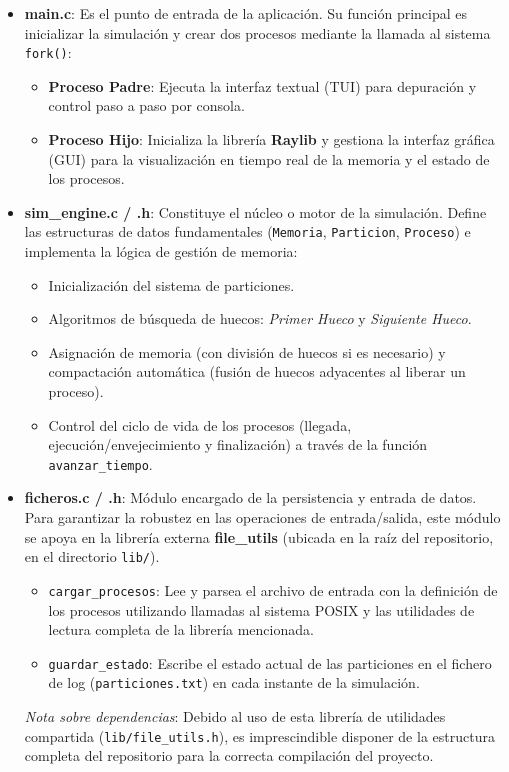 \documentclass[11pt,a4paper]{article}
\begin{document}
\begin{itemize}
    \item \textbf{main.c}: Es el punto de entrada de la aplicación. Su función principal es inicializar la simulación y crear dos procesos mediante 
    la llamada al sistema \texttt{fork()}:
    \begin{itemize}
        \item \textbf{Proceso Padre}: Ejecuta la interfaz textual (TUI) para depuración y control paso a paso por consola.
        \item \textbf{Proceso Hijo}: Inicializa la librería \textbf{Raylib} y gestiona la interfaz gráfica (GUI) para la visualización en tiempo real
        de la memoria y el estado de los procesos.
    \end{itemize}
    
    \item \textbf{sim\_engine.c / .h}: Constituye el núcleo o motor de la simulación. Define las estructuras de datos fundamentales (\texttt{Memoria}, 
    \texttt{Particion}, \texttt{Proceso}) e implementa la lógica de gestión de memoria:
    \begin{itemize}
        \item Inicialización del sistema de particiones.
        \item Algoritmos de búsqueda de huecos: \textit{Primer Hueco} y \textit{Siguiente Hueco}.
        \item Asignación de memoria (con división de huecos si es necesario) y compactación automática (fusión de huecos adyacentes al liberar un proceso).
        \item Control del ciclo de vida de los procesos (llegada, ejecución/envejecimiento y finalización) a través de la función \texttt{avanzar\_tiempo}.
    \end{itemize}
    
    \item \textbf{ficheros.c / .h}: Módulo encargado de la persistencia y entrada de datos. Para garantizar la robustez en las operaciones de entrada/salida, este módulo se apoya en la librería externa \textbf{file\_utils} (ubicada en la raíz del repositorio, en el directorio \texttt{lib/}).
    \begin{itemize}
        \item \texttt{cargar\_procesos}: Lee y parsea el archivo de entrada con la definición de los procesos utilizando llamadas al sistema POSIX y las utilidades de lectura completa de la librería mencionada.
        \item \texttt{guardar\_estado}: Escribe el estado actual de las particiones en el fichero de log (\texttt{particiones.txt}) en cada instante 
        de la simulación.
    \end{itemize}
    \textit{Nota sobre dependencias}: Debido al uso de esta librería de utilidades compartida (\texttt{lib/file\_utils.h}), es imprescindible disponer de la estructura completa del repositorio para la correcta compilación del proyecto.
\end{itemize}
\end{document}
